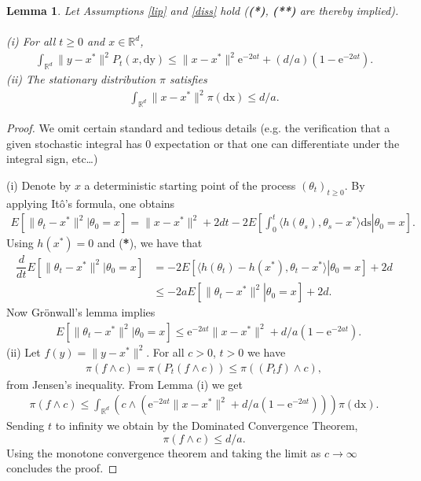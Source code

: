 \documentclass[a4paper]{article}
\newtheorem{lemma}[theorem]{Lemma}
\def\e{\text{e}}
\def\Rd{\mathbb{R}^d}
\begin{document}
\begin{lemma}\label{prop2}
	Let Assumptions \ref{lip} and \ref{diss} hold ({\bf (*)}, {\bf (**)} are thereby implied).
	\\
	\\
	(i) For all $t\geq 0$ and $x \in \Rd$,
	\begin{align*}
	\int_{\Rd}\|y-x^*\|^2P_t(x,\mathrm{dy})\leq \|x-x^*\|^2 \e^{-2at}+(d/a)(1-\e^{-2at}).
	\end{align*}
	(ii) The stationary distribution $\pi$ satisfies
	\begin{align*}
	\int_{\Rd}\|x-x^*\|^2\pi(\mathrm{dx}) \leq d/a.
	\end{align*}
\end{lemma}
\begin{proof} We omit certain standard and tedious details (e.g. the
verification that a given stochastic integral has $0$ expectation or that one
can differentiate under the integral sign, etc\ldots)

	(i) Denote by $x$ a deterministic starting point of the process $(\theta_t)_{t \geq 0}$. By applying It\^{o}'s formula,  %
	one obtains
	\begin{align*}
	E\left[ \|\theta_t-x^*\|^2|\theta_0=x\right]
	=\|x-x^*\|^2+2dt -2E\left[\left. \int_0^t \langle h(\theta_s),\theta_s-x^* \rangle \mathrm{ds} \right|\theta_0=x\right].
	\end{align*}
Using $h(x^*)=0$ and ({\bf **}), we have that
	\begin{align*}
	\dfrac{d}{dt}E[\|\theta_t-x^*\|^2 |\theta_0=x] &=-2E\left[\left.\langle h(\theta_t)-h(x^*),\theta_t-x^* \rangle\right|\theta_0=x \right]+2d \\ &\leq  -2aE\left[\left. \|\theta_t-x^*\|^2\right|\theta_0=x \right]+2d.
	\end{align*}
Now Gr\"{o}nwall's lemma implies
	\begin{align*}
	&E[\|\theta_t-x^*\|^2|\theta_0=x]\leq \e^{-2at} \|x-x^*\|^2+d/a\left(1 -\e^{-2at}\right).
	\end{align*}
	(ii) Let $f(y)=\|y-x^*\|^2$. For all $c>0$, $t>0$ we have
	\begin{align*}
	\pi(f \wedge c) = \pi(P_t(f \wedge c)) \leq \pi((P_t f) \wedge c),
	\end{align*}
	from Jensen's inequality. From Lemma (i) we get
	\begin{align*}
	\pi(f \wedge c)\leq \int_{\Rd} \left(c \wedge \left(\e^{-2at} \|x-x^*\|^2+d/a\left(1 -\e^{-2at}\right)\right)\right) \pi(\mathrm{dx}).
	\end{align*}
	Sending $t$ to infinity we obtain by the Dominated Convergence Theorem,
	\[
	\pi(f \wedge c)\leq d/a.
	\]
	Using the monotone convergence theorem and taking the limit as $c \rightarrow \infty$ concludes the proof.
\end{proof}
\end{document}

